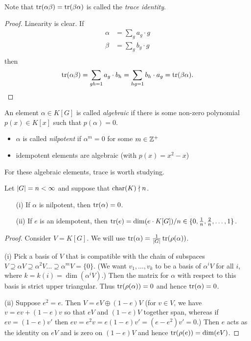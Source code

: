 Note that $\operatorname{tr}(\alpha \beta) = \operatorname{tr}(\beta \alpha)$ is called the \emph{trace identity}.

\begin{proof}
    Linearity is clear.
    If
    \begin{align*}
        \alpha &= \sum_{g} a_g \cdot g \\
        \beta &= \sum_{g} b_g \cdot g \\
    \end{align*}
    then \[
        \operatorname{tr}(\alpha \beta) = \sum_{gh = 1} a_g \cdot b_h = \sum_{hg = 1} b_h \cdot a_g = \operatorname{tr}(\beta \alpha).
    \]
\end{proof}

\begin{definition}
    An element $\alpha \in K[G]$ is called \emph{algebraic} if there is some non-zero polynomial $p(x) \in K[x]$ such that $p(\alpha) = 0$.
\end{definition}

\begin{example}
    \begin{itemize}
        \item $\alpha$ is called \emph{nilpotent} if $\alpha^m = 0$ for some $m \in \mathbb{Z}^+$
        \item idempotent elements are algebraic (with $p(x) = x^2 - x$)
    \end{itemize}
\end{example}
For these algebraic elements, trace is worth studying.

\begin{lemma}
    \label{lemma:alg_traces_of_finite_groups}
    Let $\lvert G \rvert = n < \infty$ and suppose that $\mathrm{char}(K) \nmid n$.
    \begin{enumerate}
        \item[(i)] If $\alpha$ is nilpotent, then $\operatorname{tr}(\alpha) = 0$.
        \item[(ii)] If $e$ is an idempotent, then $\operatorname{tr}(e) = \dim(e \cdot K[G]) / n \in \{0, \frac{1}{n}, \frac{2}{n}, \dots, 1\}$.
    \end{enumerate}
\end{lemma}

\begin{proof}
    Consider $V = K[G]$.
    We will use $\operatorname{tr}(\alpha) = \frac{1}{\lvert G \rvert} \operatorname{tr}(\rho(\alpha))$.

    (i) Pick a basis of $V$ that is compatible with the chain of subspaces $V \supseteq \alpha V \supseteq \alpha^2 V \dots \supseteq \alpha^m V = \{0\}$.
    (We want $v_1, \dots, v_k$ to be a basis of $\alpha^i V$ for all $i$, where $k = k(i) = \dim(\alpha^i V)$.)
    Then the matrix for $\alpha$ with respect to this basis is strict upper triangular.
    Thus $\operatorname{tr}(\rho(\alpha)) = 0$ and hence $\operatorname{tr}(\alpha) = 0$.

    (ii) Suppose $e^2 = e$.
    Then $V = eV \oplus (1-e)V$ (for $v \in V$, we have $v = ev + (1-e)v$ so that $eV$ and $(1-e)V$ together span, whereas if $ev = (1-e)v'$ then $ev = e^2 v = e(1-e)v' = (e - e^2)v' = 0$.)
    Then $e$ acts as the identity on $eV$ and is zero on $(1-e)V$ and hence $\operatorname{tr}(\rho(e)) = \dim(eV)$.
\end{proof}

